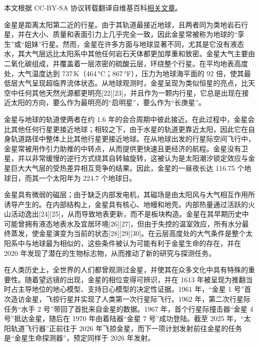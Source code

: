 
本文根据 CC-BY-SA 协议转载翻译自维基百科\href{https://en.wikipedia.org/wiki/Venus}{相关文章}。

金星是距离太阳第二近的行星。由于其轨道最接近地球，且两者同为类地岩石行星，并在大小、质量和表面引力上几乎完全一致，因此金星常被称为地球的“孪生”或“姐妹”行星。然而，金星在许多方面与地球显著不同，尤其是它没有液态水，其大气层远比太阳系中其他任何岩石天体都更加厚重和致密。金星大气主要由二氧化碳组成，并覆盖着一层浓密的硫酸云层，环绕整个行星。在平均地表高度处，大气温度达到 737\,K（464\,°C；867\,°F），压力为地球海平面的 92 倍，使其最低层大气呈现超临界流体状态。从地球观测时，金星呈现为类似恒星的亮点，比天空中任何其他天然光源都更明亮[22][23]，并且作为一颗内行星，它总是出现在接近太阳的方向，要么作为最明亮的“启明星”，要么作为“长庚星”。

金星与地球的轨道使两者在约 1.6 年的会合周期中彼此接近。在此过程中，金星会比其他任何行星更接近地球；相较之下，由于水星的轨道更靠近太阳，因此它在自身轨道路径中整体上比其他行星更接近地球。在从地球出发的行星际空间飞行中，金星常被用作引力助推的中转点，从而提供更快速且更经济的航程。金星没有卫星，并以非常缓慢的逆行方式绕其自转轴旋转，这被认为是太阳潮汐锁定效应与金星巨大大气层的受热差异相互竞争的结果。因此，金星的一昼夜长达 116.75 个地球日，而其一个太阳年为 224.7 个地球日。

金星具有微弱的磁层；由于缺乏内部发电机，其磁场是由太阳风与大气相互作用所诱导产生的。在内部结构上，金星具有核心、地幔和地壳。内部热量通过活跃的火山活动逸出[24][25]，从而导致地表更新，而不是板块构造。金星在其早期历史中可能曾拥有液态地表水及宜居环境[26][27]，但由于失控的温室效应，所有水分最终蒸发，使金星演变为当前的状态[28][29][30]。在云层高度处的大气条件是整个太阳系中与地球最为相似的，这些条件被认为可能有利于金星生命的存在，并在 2020 年发现了潜在的生物标志物，从而推动了新的研究与探测任务。

在人类历史上，全世界的人们都曾观测过金星，并使其在众多文化中具有特殊的重要性。随着望远镜的出现，金星的相位变得可辨识，并在 1613 年被呈现为推翻当时占主导地位的地心模型、支持日心模型的决定性证据。1961 年，“金星 1 号”首次造访金星，飞掠行星并实现了人类第一次行星际飞行。1962 年，第二次行星际任务“水手 2 号”带回了首批来自金星的数据。1967 年，首个行星际撞击器“金星 4 号”抵达金星，随后在 1970 年由着陆器“金星 7 号”成功登陆。截至 2025 年，“太阳轨道飞行器”正前往于 2026 年飞掠金星，而下一项计划发射前往金星的任务是“金星生命探测器”，预定同样于 2026 年发射。
